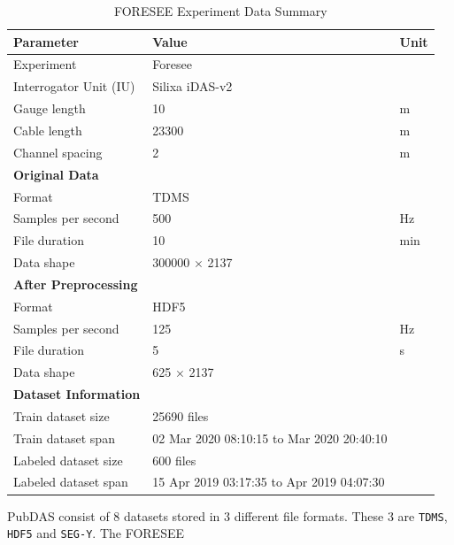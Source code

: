 \begin{table}[!htbp]
    \centering
    \small
    \begin{tabular}{@{}p{}p{}p{}@{}}
        \toprule
        \textbf{Parameter} & \textbf{Value} & \textbf{Unit} \\
        \midrule
        Experiment & Foresee & \\
        Interrogator Unit (IU) & Silixa iDAS-v2 & \\
        Gauge length & 10 & \si{\meter} \\
        Cable length & 23300 & \si{\meter} \\
        Channel spacing & 2 & \si{\meter} \\
        \midrule
        \textbf{Original Data} & & \\
        Format & TDMS & \\
        Samples per second & 500 & \si{\hertz} \\
        File duration & 10 & \si{\minute} \\
        Data shape & 300000 \(\times\) 2137 & \\
        \midrule
        \textbf{After Preprocessing} & & \\
        Format & HDF5 & \\
        Samples per second & 125 & \si{\hertz} \\
        File duration & 5 & \si{\second} \\
        Data shape & 625 \(\times\) 2137 & \\
        \midrule
        \textbf{Dataset Information} & & \\
        Train dataset size & 25690 files & \\
        Train dataset span & 02 Mar 2020 08:10:15 to \newline 03 Mar 2020 20:40:10 & \\
        Labeled dataset size & 600 files & \\
        Labeled dataset span & 15 Apr 2019 03:17:35 to \newline 15 Apr 2019 04:07:30 & \\
        \bottomrule
    \end{tabular}
    \caption{FORESEE Experiment Data Summary}
    \label{tab:foresee_experiment_data}
\end{table}

PubDAS consist of 8 datasets stored in 3 different file formats. These 3 are \texttt{TDMS}, \texttt{HDF5} and \texttt{SEG-Y}. 
The FORESEE

